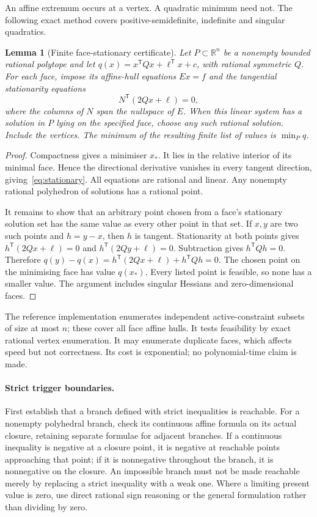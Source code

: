 \documentclass[11pt,a4paper]{article}
\newtheorem{lemma}[theorem]{Lemma}
\newcommand{\R}{\mathbb R}
\begin{document}
An affine extremum occurs at a vertex. A quadratic minimum need not. The following exact method covers positive-semidefinite, indefinite and singular quadratics.

\begin{lemma}[Finite face-stationary certificate]\label{lem:quadratic}
Let $P\subset\R^n$ be a nonempty bounded rational polytope and let
$q(x)=x^{\mathsf T}Qx+\ell^{\mathsf T}x+c$, with rational symmetric $Q$.
For each face, impose its affine-hull equations $Ex=f$ and the tangential stationarity equations
\begin{equation}\label{eq:stationary}
 N^{\mathsf T}(2Qx+\ell)=0,
\end{equation}
where the columns of $N$ span the nullspace of $E$. When this linear system has a solution in $P$ lying on the specified face, choose any such rational solution. Include the vertices. The minimum of the resulting finite list of values is $\min_Pq$.
\end{lemma}
\begin{proof}
Compactness gives a minimiser $x_*$. It lies in the relative interior of its minimal face. Hence the directional derivative vanishes in every tangent direction, giving~\eqref{eq:stationary}. All equations are rational and linear. Any nonempty rational polyhedron of solutions has a rational point.

It remains to show that an arbitrary point chosen from a face's stationary solution set has the same value as every other point in that set. If $x,y$ are two such points and $h=y-x$, then $h$ is tangent. Stationarity at both points gives $h^{\mathsf T}(2Qx+\ell)=0$ and $h^{\mathsf T}(2Qy+\ell)=0$. Subtraction gives $h^{\mathsf T}Qh=0$. Therefore
$q(y)-q(x)=h^{\mathsf T}(2Qx+\ell)+h^{\mathsf T}Qh=0$.
The chosen point on the minimising face has value $q(x_*)$. Every listed point is feasible, so none has a smaller value. The argument includes singular Hessians and zero-dimensional faces.
\end{proof}
The reference implementation enumerates independent active-constraint subsets of size at most $n$; these cover all face affine hulls. It tests feasibility by exact rational vertex enumeration. It may enumerate duplicate faces, which affects speed but not correctness. Its cost is exponential; no polynomial-time claim is made.

\paragraph{Strict trigger boundaries.}
First establish that a branch defined with strict inequalities is reachable. For a nonempty polyhedral branch, check its continuous affine formula on its actual closure, retaining separate formulae for adjacent branches. If a continuous inequality is negative at a closure point, it is negative at reachable points approaching that point; if it is nonnegative throughout the branch, it is nonnegative on the closure. An impossible branch must not be made reachable merely by replacing a strict inequality with a weak one. Where a limiting present value is zero, use direct rational sign reasoning or the general formulation rather than dividing by zero.
\end{document}
